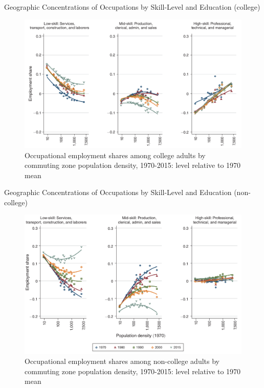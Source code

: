 \documentclass{beamer}
\begin{document}
\begin{frame}{Geographic Concentrations of Occupations by Skill-Level and Education (college)}

\begin{figure}
	\begin{center}
		\includegraphics[scale=0.4]{Figures/Fig5A_OccShare_Education} 
		\caption{Occupational employment shares among college adults by commuting zone population density, 1970-2015: level relative to 1970 mean}
	\end{center}
	
\end{figure}

\end{frame}


\begin{frame}{Geographic Concentrations of Occupations by Skill-Level and Education (non-college)}

\begin{figure}
	\begin{center}
		\includegraphics[scale=0.4]{Figures/Fig5B_OccShare_Education}
		\caption{Occupational employment shares among non-college adults by commuting zone population density, 1970-2015: level relative to 1970 mean}
	\end{center}
	
\end{figure}

\end{frame}
\end{document}
